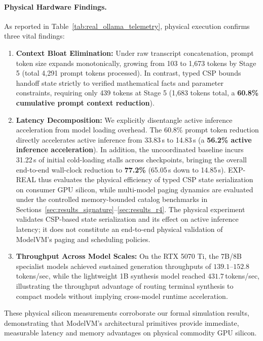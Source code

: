 \paragraph{Physical Hardware Findings.}
As reported in Table~\ref{tab:real_ollama_telemetry}, physical execution confirms three vital findings:
\begin{enumerate}
    \item \textbf{Context Bloat Elimination:} Under raw transcript concatenation, prompt token size expands monotonically, growing from 103 to 1,673 tokens by Stage 5 (total 4,291 prompt tokens processed). In contrast, typed CSP bounds handoff state strictly to verified mathematical facts and parameter constraints, requiring only 439 tokens at Stage 5 (1,683 tokens total, a \textbf{60.8\% cumulative prompt context reduction}).
    \item \textbf{Latency Decomposition:} We explicitly disentangle active inference acceleration from model loading overhead. The 60.8\% prompt token reduction directly accelerates active inference from 33.83\,s to 14.83\,s (a \textbf{56.2\% active inference acceleration}). In addition, the uncoordinated baseline incurs 31.22\,s of initial cold-loading stalls across checkpoints, bringing the overall end-to-end wall-clock reduction to \textbf{77.2\%} (65.05\,s down to 14.85\,s). EXP-REAL thus evaluates the physical efficiency of typed CSP state serialization on consumer GPU silicon, while multi-model paging dynamics are evaluated under the controlled memory-bounded catalog benchmarks in Sections~\ref{sec:results_signature}--\ref{sec:results_r4}. The physical experiment validates CSP-based state serialization and its effect on active inference latency; it does not constitute an end-to-end physical validation of ModelVM's paging and scheduling policies.
    \item \textbf{Throughput Across Model Scales:} On the RTX 5070 Ti, the 7B/8B specialist models achieved sustained generation throughputs of $139.1\text{--}152.8$\,tokens/sec, while the lightweight 1B synthesis model reached $431.7$\,tokens/sec, illustrating the throughput advantage of routing terminal synthesis to compact models without implying cross-model runtime acceleration.
\end{enumerate}
These physical silicon measurements corroborate our formal simulation results, demonstrating that ModelVM's architectural primitives provide immediate, measurable latency and memory advantages on physical commodity GPU silicon.








